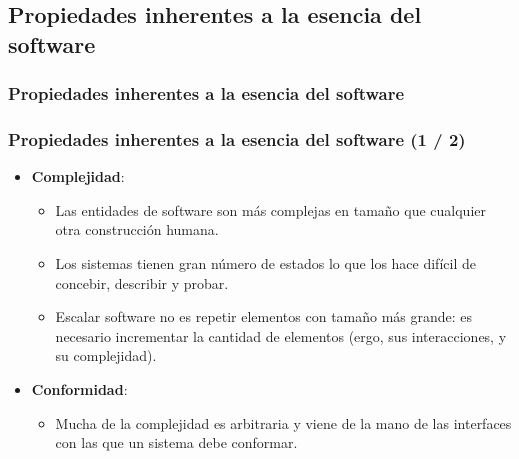 \documentclass{beamer}
\begin{document}
\subsection{Propiedades inherentes a la esencia del software}
\frametitle{Propiedades inherentes a la esencia del software}
\begin{frame}
\frametitle{Propiedades inherentes a la esencia del software (1 / 2)}
\begin{itemize}
	\item \textbf{Complejidad}:
	  \begin{itemize}
		  \item Las entidades de software son más complejas en tamaño que cualquier otra construcción humana.
		  \item Los sistemas tienen gran número de estados lo que los hace difícil de concebir, describir y probar.
		  \item Escalar software no es repetir elementos con tamaño más grande: es necesario incrementar la cantidad de elementos (ergo, sus interacciones, y su complejidad).
	  \end{itemize}
\item \textbf{Conformidad}:
	  \begin{itemize}
		  \item Mucha de la complejidad es arbitraria y viene de la mano de las interfaces con las que un sistema debe conformar.			
	  \end{itemize}
	
\end{itemize}

\end{frame}
\end{document}
